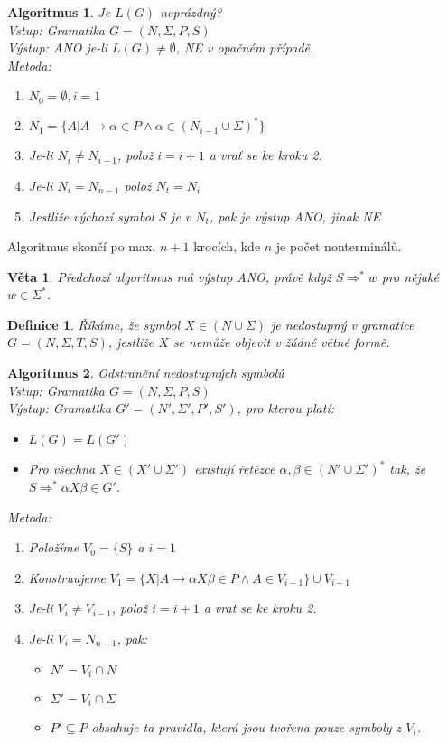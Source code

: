 \documentclass[a4paper, 11pt]{report}
\newtheorem{mydef}{Definice}[chapter]
\newtheorem{veta}{Věta}[chapter]
\newtheorem{alg}{Algoritmus}[chapter]
\begin{document}
\begin{alg}
Je $L(G)$ neprázdný?\\
Vstup: Gramatika $G = (N, \Sigma, P, S)$\\
Výstup: ANO je-li $L(G) \not= \emptyset$, NE v opačném případě.\\
Metoda:
\begin{enumerate}
	\item $N_0 = \emptyset, i = 1$
	\item $N_1 = \{A | A \to \alpha \in P \land \alpha \in (N_{i-1} \cup \Sigma)^*\}$
	\item Je-li $N_i \not= N_{i-1}$, polož $i = i + 1$ a vrať se ke kroku 2.
	\item Je-li $N_i = N_{n-1}$ polož $N_t = N_i$
	\item Jestliže výchozí symbol $S$ je v $N_t$, pak je výstup ANO, jinak NE
\end{enumerate}
\end{alg}
Algoritmus skončí po max. $n+1$ krocích, kde $n$ je počet nonterminálů.

\begin{veta}
Předchozí algoritmus má výstup ANO, právě když $S \Rightarrow^* w$ pro nějaké $w \in \Sigma^*$.
\end{veta}

\begin{mydef}
Říkáme, že symbol $X \in (N \cup \Sigma)$ je \emph{nedostupný} v gramatice $G = (N, \Sigma, T, S)$, jestliže $X$ se nemůže objevit v žádné větné formě.
\end{mydef}

\begin{alg}
Odstranění nedostupných symbolů\\
Vstup: Gramatika $G = (N, \Sigma, P, S)$\\
Výstup: Gramatika $G' = (N', \Sigma', P', S')$, pro kterou platí:
\begin{itemize}
	\item $L(G) = L(G')$
	\item Pro všechna $X \in (X' \cup \Sigma')$ existují řetězce $\alpha, \beta \in (N' \cup \Sigma')^*$ tak, že $S \Rightarrow^* \alpha X \beta \in G'$.
\end{itemize}
Metoda:
\begin{enumerate}
	\item Položíme $V_0 = \{S\}$ a $i = 1$
	\item Konstruujeme $V_1 = \{X | A \to \alpha X \beta \in P \land A \in V_{i-1}\} \cup V_{i-1}$
	\item Je-li $V_i \not= V_{i-1}$, polož $i = i + 1$ a vrať se ke kroku 2.
	\item Je-li $V_i = N_{n-1}$, pak:
	\begin{itemize}
		\item $N' = V_i \cap N$
		\item $\Sigma' = V_i \cap \Sigma$
		\item $P' \subseteq P$ obsahuje ta pravidla, která jsou tvořena pouze symboly z $V_i$.
	\end{itemize}
\end{enumerate}
\end{alg}
\end{document}
